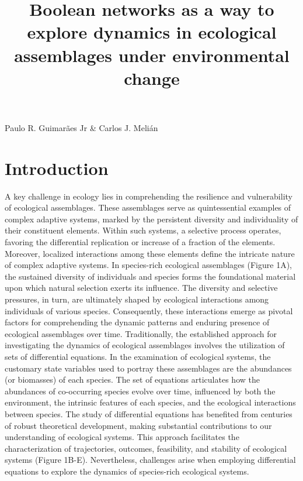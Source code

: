\documentclass[10pt]{article}
\title{Boolean networks as a way to explore dynamics in ecological assemblages under environmental change}
\date{}
\begin{document}
\setlength{\abovedisplayskip}{1pt}
\setlength{\belowdisplayskip}{1pt}

\maketitle
\justify


Paulo R. Guimarães Jr & Carlos J. Melián

\section{Introduction}
A key challenge in ecology lies in comprehending the resilience and vulnerability of ecological assemblages. These assemblages serve as quintessential examples of complex adaptive systems, marked by the persistent diversity and individuality of their constituent elements. Within such systems, a selective process operates, favoring the differential replication or increase of a fraction of the elements. Moreover, localized interactions among these elements define the intricate nature of complex adaptive systems. In species-rich ecological assemblages (Figure 1A), the sustained diversity of individuals and species forms the foundational material upon which natural selection exerts its influence. The diversity and selective pressures, in turn, are ultimately shaped by ecological interactions among individuals of various species. Consequently, these interactions emerge as pivotal factors for comprehending the dynamic patterns and enduring presence of ecological assemblages over time.
Traditionally, the established approach for investigating the dynamics of ecological assemblages involves the utilization of sets of differential equations. In the examination of ecological systems, the customary state variables used to portray these assemblages are the abundances (or biomasses) of each species. The set of equations articulates how the abundances of co-occurring species evolve over time, influenced by both the environment, the intrinsic features of each species, and the ecological interactions between species. The study of differential equations has benefited from centuries of robust theoretical development, making substantial contributions to our understanding of ecological systems. This approach facilitates the characterization of trajectories, outcomes, feasibility, and stability of ecological systems (Figure 1B-E). Nevertheless, challenges arise when employing differential equations to explore the dynamics of species-rich ecological systems.
\end{document}
